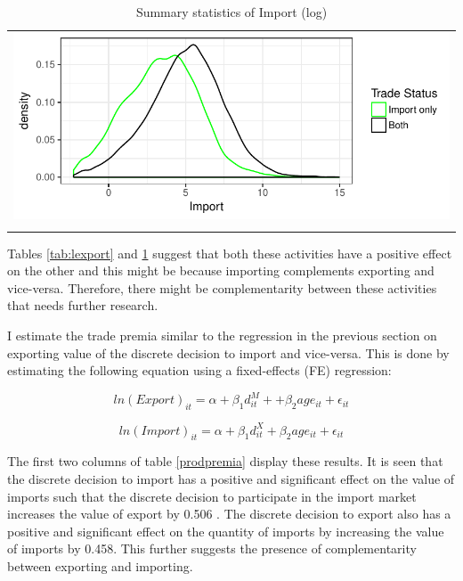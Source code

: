 \documentclass[11pt]{article}
\begin{document}
\begin{center}
\begin{table}[H]
\caption{Summary statistics of Import (log)}
\label{tab:limport}
\begin{tabular}{c}
 \includegraphics{./PICS/denslimport.pdf}   \\ 
   \\  
\end{tabular}
\end{table}
\end{center}
Tables \ref{tab:lexport} and \ref{tab:limport} suggest that both these activities have a
positive effect on the other and this might be because importing
complements exporting and vice-versa. Therefore, there might be
complementarity between these
activities that needs further research. 

I estimate the trade premia similar to the regression in the previous
section on exporting value of the discrete
decision to import and vice-versa. This is done by estimating the
following equation using a fixed-effects (FE) regression:

$$  ln(Export)_{it} = \alpha +  \beta_{1} d_{it}^{M}+
+ \beta_{2} age_{it} + \epsilon_{it}$$

$$  ln(Import)_{it} = \alpha + \beta_{1} d_{it}^{X} + \beta_{2} age_{it} + \epsilon_{it}$$ 

\begin{center}

\end{center}

The first two columns of table \ref{prodpremia} display these
results. It is seen that the discrete decision to import has a positive and
significant effect on the value of imports such that the discrete
decision to participate in the import market increases the value of
export by 0.506 . The discrete decision to
export also has a positive and significant effect on the quantity of
imports by increasing the value of imports by 0.458.  This further suggests the presence of complementarity
between exporting and importing. 
\end{document}
